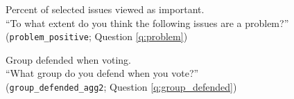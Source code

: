 \begin{figure}[h!]
    \cprotect\caption[Importance of selected issues]{Percent of selected issues viewed as important.\\ ``To what extent do you think the following issues are a problem?'' (\verb|problem_positive|; Question \ref{q:problem})}\label{fig:problem}
\end{figure}

\begin{figure}[h!]
    \cprotect\caption[Group defended when voting]{Group defended when voting. \\ ``What group do you defend when you vote?'' (\verb|group_defended_agg2|; Question \ref{q:group_defended})}\label{fig:group_defended}
\end{figure}



